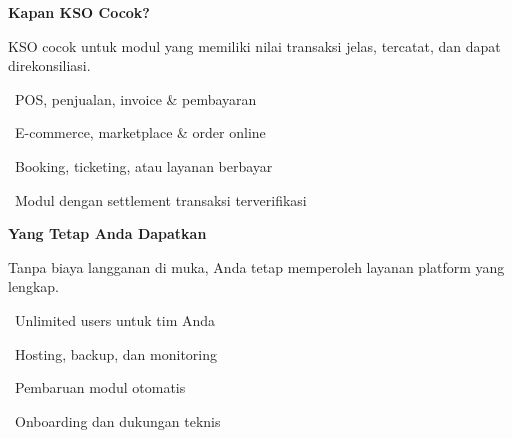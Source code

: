 \documentclass[a4paper]{article}
\begin{document}
\noindent
\begin{minipage}[t]{0.485\textwidth}
    \colorbox{EmeraldBg}{%
        \begin{minipage}[t][5.0cm][c]{\dimexpr\linewidth-2\fboxsep\relax}
            {\fontsize{11}{14}\selectfont\bfseries\color{EmeraldDark} Kapan KSO Cocok?}\par\vspace{5pt}
            {\fontsize{9}{12}\selectfont\color{TextDark}%
            KSO cocok untuk modul yang memiliki nilai transaksi jelas, tercatat, dan dapat direkonsiliasi.\par\vspace{5pt}%
            \textbullet\ POS, penjualan, invoice \& pembayaran\par\vspace{2pt}%
            \textbullet\ E-commerce, marketplace \& order online\par\vspace{2pt}%
            \textbullet\ Booking, ticketing, atau layanan berbayar\par\vspace{2pt}%
            \textbullet\ Modul dengan settlement transaksi terverifikasi}
        \end{minipage}}%
\end{minipage}%
\hfill
\begin{minipage}[t]{0.485\textwidth}
    \colorbox{BlueBg}{%
        \begin{minipage}[t][5.0cm][c]{\dimexpr\linewidth-2\fboxsep\relax}
            {\fontsize{11}{14}\selectfont\bfseries\color{BlueDark} Yang Tetap Anda Dapatkan}\par\vspace{5pt}
            {\fontsize{9}{12}\selectfont\color{TextDark}%
            Tanpa biaya langganan di muka, Anda tetap memperoleh layanan platform yang lengkap.\par\vspace{5pt}%
            \textbullet\ Unlimited users untuk tim Anda\par\vspace{2pt}%
            \textbullet\ Hosting, backup, dan monitoring\par\vspace{2pt}%
            \textbullet\ Pembaruan modul otomatis\par\vspace{2pt}%
            \textbullet\ Onboarding dan dukungan teknis}
        \end{minipage}}%
\end{minipage}
\end{document}
